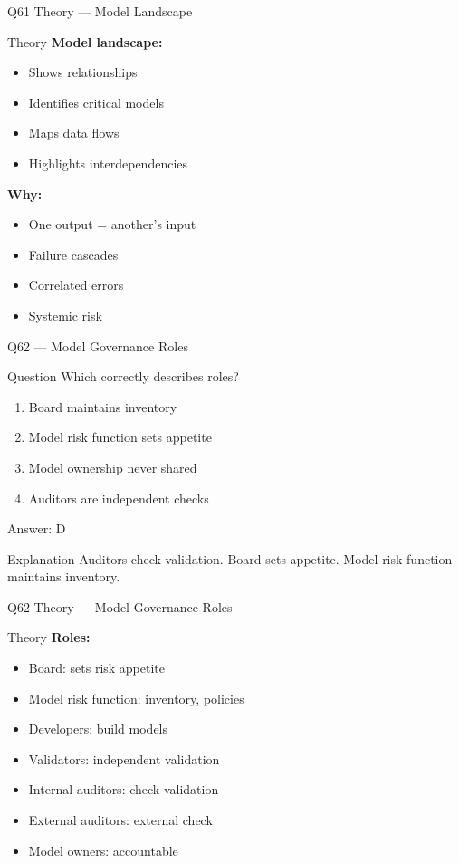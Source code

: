 \documentclass[aspectratio=169,8pt]{beamer}
\begin{document}
	\begin{frame}{Q61 Theory --- Model Landscape}
		\begin{block}{Theory}
			\textbf{Model landscape:}
			\begin{itemize}
				\item Shows relationships
				\item Identifies critical models
				\item Maps data flows
				\item Highlights interdependencies
			\end{itemize}
			\textbf{Why:}
			\begin{itemize}
				\item One output = another's input
				\item Failure cascades
				\item Correlated errors
				\item Systemic risk
			\end{itemize}
		\end{block}
	\end{frame}
	
	\begin{frame}{Q62 --- Model Governance Roles}
		\begin{block}{Question}
			Which correctly describes roles?
		\end{block}
		\begin{enumerate}[label=\Alph*.]
			\item Board maintains inventory
			\item Model risk function sets appetite
			\item Model ownership never shared
			\item Auditors are independent checks
		\end{enumerate}
		\begin{exampleblock}{Answer: D}
		\end{exampleblock}
		\begin{block}{Explanation}
			Auditors check validation. Board sets appetite. Model risk function maintains inventory.
		\end{block}
	\end{frame}
	
	\begin{frame}{Q62 Theory --- Model Governance Roles}
		\begin{block}{Theory}
			\textbf{Roles:}
			\begin{itemize}
				\item Board: sets risk appetite
				\item Model risk function: inventory, policies
				\item Developers: build models
				\item Validators: independent validation
				\item Internal auditors: check validation
				\item External auditors: external check
				\item Model owners: accountable
			\end{itemize}
		\end{block}
	\end{frame}
	
\end{document}
